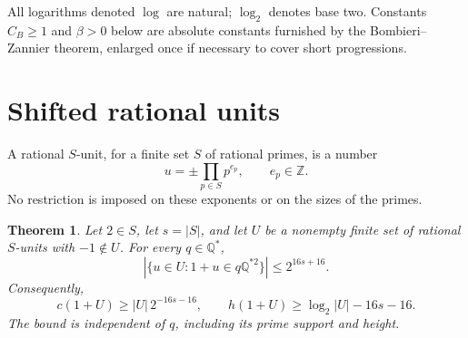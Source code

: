\documentclass[11pt,letterpaper]{article}
\newtheorem{theorem}{Theorem}[section]
\theoremstyle{remark}\newtheorem{remark}[theorem]{Remark}
\newcommand{\Q}{\mathbb Q}
\begin{document}
All logarithms denoted $\log$ are natural; $\log_2$ denotes base two. Constants $C_B\ge1$ and $\beta>0$ below are absolute constants furnished by the Bombieri--Zannier theorem, enlarged once if necessary to cover short progressions.

\section{Shifted rational units}
A rational $S$-unit, for a finite set $S$ of rational primes, is a number
\[
 u=\pm\prod_{p\in S}p^{e_p},\qquad e_p\in\mathbb Z.
\]
No restriction is imposed on these exponents or on the sizes of the primes.

\begin{theorem}\label{thm:units}
Let $2\in S$, let $s=|S|$, and let $U$ be a nonempty finite set of rational $S$-units with $-1\notin U$. For every $q\in\Q^*$,
\begin{equation}\label{eq:mult}
 |\{u\in U:1+u\in q\Q^{*2}\}|\le 2^{16s+16}.
\end{equation}
Consequently,
\begin{equation}\label{eq:unitrank}
 c(1+U)\ge |U|\,2^{-16s-16},\qquad
 h(1+U)\ge\log_2|U|-16s-16.
\end{equation}
The bound is independent of $q$, including its prime support and height.
\end{theorem}
\end{document}
